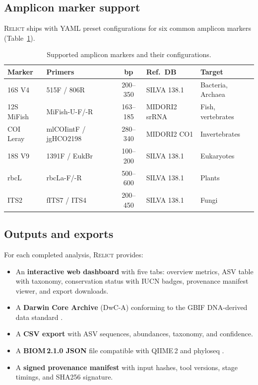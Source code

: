\documentclass[11pt, a4paper]{article}
\newcommand{\relict}{\textsc{Relict}}
\begin{document}
\subsection{Amplicon marker support}

\relict{} ships with YAML preset configurations for six common
amplicon markers (Table~\ref{tab:markers}).

\begin{table}[H]
    \centering
    \caption{Supported amplicon markers and their configurations.}
    \label{tab:markers}
    \small
    \begin{tabularx}{\textwidth}{llclX}
        \toprule
        \textbf{Marker} & \textbf{Primers} & \textbf{bp} &
        \textbf{Ref.\ DB} & \textbf{Target} \\
        \midrule
        16S V4   & 515F / 806R         & 200--350 & SILVA 138.1
                 & Bacteria, Archaea \\
        12S MiFish & MiFish-U-F/-R     & 163--185 & MIDORI2 srRNA
                 & Fish, vertebrates \\
        COI Leray  & mlCOIintF / jgHCO2198 & 280--340 & MIDORI2 CO1
                 & Invertebrates \\
        18S V9   & 1391F / EukBr       & 100--200 & SILVA 138.1
                 & Eukaryotes \\
        rbcL     & rbcLa-F/-R          & 500--600 & SILVA 138.1
                 & Plants \\
        ITS2     & fITS7 / ITS4        & 200--450 & SILVA 138.1
                 & Fungi \\
        \bottomrule
    \end{tabularx}
\end{table}

\subsection{Outputs and exports}

For each completed analysis, \relict{} provides:
\begin{itemize}[itemsep=0.2em]
    \item An \textbf{interactive web dashboard} with five tabs:
    overview metrics, ASV table with taxonomy, conservation status
    with IUCN badges, provenance manifest viewer, and export
    downloads.
    \item A \textbf{Darwin Core Archive} (DwC-A) conforming to the
    GBIF DNA-derived data standard \citep{GBIF2023}.
    \item A \textbf{CSV export} with ASV sequences, abundances,
    taxonomy, and confidence.
    \item A \textbf{BIOM\,2.1.0 JSON} file compatible with QIIME\,2
    and phyloseq \citep{McMurdie2013}.
    \item A \textbf{signed provenance manifest} with input hashes,
    tool versions, stage timings, and SHA256 signature.
\end{itemize}
\end{document}
